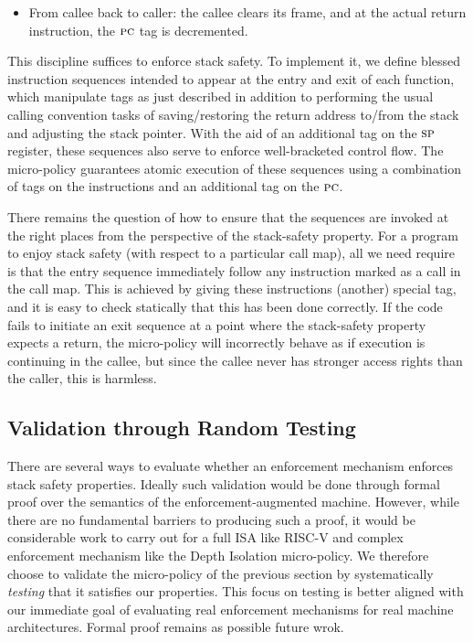 \documentclass[acmsmall,review,anonymous]{acmart}\settopmatter{printfolios=true,printccs=false,printacmref=false}
\begin{document}
{{\begin{itemize}
\item From callee back to caller: the callee clears its frame, and at
  the actual return instruction,
  the $\textsc{pc}$ tag is decremented.

\end{itemize}

This discipline suffices to enforce stack safety.
To implement it,  we define blessed instruction sequences
intended to appear at the entry and exit of each function,
which manipulate tags as just described in addition to performing the
usual calling convention tasks of saving/restoring the return address to/from
the stack and adjusting the stack pointer. With the aid of an additional tag on
the $\textsc{sp}$ register, these sequences also serve to enforce
well-bracketed control flow.
The micro-policy guarantees atomic execution of these sequences
using a combination of tags on the instructions
and an additional tag on the $\textsc{pc}$.

There remains the question of how to ensure that the sequences are
invoked at the right places from the perspective of the stack-safety
property. For a program to enjoy stack safety
(with respect to a particular call map), all we need require is that
the entry sequence immediately follow  any instruction marked as a call
in the call map. This is achieved by giving these instructions (another) special tag,
and it is easy to check statically that this has been done correctly.
If the code fails to initiate an exit
sequence at a point where the stack-safety property expects a return,
the micro-policy will incorrectly behave as if execution
is continuing in the callee, but since the callee never has stronger access
rights than the caller, this is harmless.

\subsection{Validation through Random Testing}
\label{sec:testing}

There are several ways to evaluate whether an enforcement mechanism enforces
stack safety properties. Ideally such validation would be done through formal proof over
the semantics of the enforcement-augmented machine.
However, while there are no fundamental barriers to producing such a proof,
it would be considerable work to carry out for a full ISA like RISC-V and
complex enforcement mechanism like the Depth Isolation micro-policy.
We therefore choose to validate the micro-policy of the previous section by
systematically \emph{testing} that it satisfies our properties.
This focus on testing is better aligned with our immediate
goal of evaluating real enforcement mechanisms for real machine architectures.
Formal proof remains as possible future wrok.

}}
\end{document}
